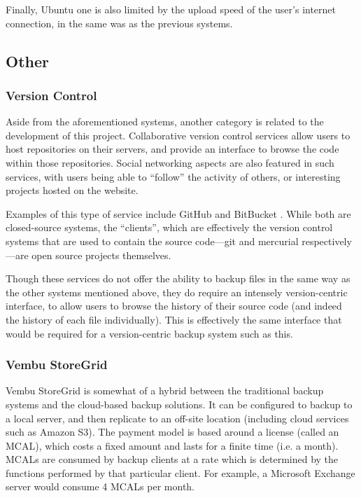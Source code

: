 Finally, Ubuntu one is also limited by the upload speed of the user's internet
connection, in the same was as the previous systems.

\subsection{Other}

\subsubsection{Version Control}

Aside from the aforementioned systems, another category is related to the
development of this project. Collaborative version control services allow users
to host repositories on their servers, and provide an interface to browse the
code within those repositories. Social networking aspects are also featured in
such services, with users being able to ``follow'' the activity of others, or
interesting projects hosted on the website.

Examples of this type of service include GitHub \cite{Github} and
BitBucket \cite{Bitbucket}. While both are closed-source systems, the
``clients'', which are effectively the version control systems that are used to
contain the source code---git and mercurial respectively---are open source
projects themselves.

Though these services do not offer the ability to backup files in the same way
as the other systems mentioned above, they do require an intensely
version-centric interface, to allow users to browse the history of their source
code (and indeed the history of each file individually). This is effectively
the same interface that would be required for a version-centric backup system
such as this.

\subsubsection{Vembu StoreGrid}

Vembu StoreGrid is somewhat of a hybrid between the traditional backup systems
and the cloud-based backup solutions. It can be configured to backup to a local
server, and then replicate to an off-site location (including cloud services
such as Amazon S3). The payment model is based around a license (called an
MCAL), which costs a fixed amount and lasts for a finite time (i.e. a month).
MCALs are consumed by backup clients at a rate which is determined by the
functions performed by that particular client. For example, a Microsoft
Exchange server would consume 4 MCALs per month.

